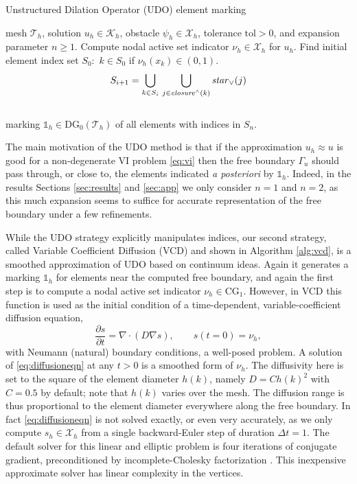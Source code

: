 \documentclass[]{interact}
\theoremstyle{plain}%
\theoremstyle{definition}
\theoremstyle{remark}
\newcommand{\grad}{\nabla}
\newcommand{\Div}{\nabla\cdot}
\newcommand{\cK}{\mathcal{K}}
\newcommand{\cT}{\mathcal{T}}
\newcommand{\cX}{\mathcal{X}}
\newcommand{\CG}{\text{CG}}
\newcommand{\DG}{\text{DG}}
\newcommand{\oneh}{\mathbb{1}_h}
\begin{document}
\begin{algorithm}[ht]
	\caption{Unstructured Dilation Operator (UDO) element marking}
	\begin{algorithmic}[1]
		\Require mesh $\cT_h$, solution $u_h \in \cK_h$, obstacle $\psi_h \in \cX_h$, tolerance $\text{tol} > 0$, and expansion parameter $n\ge 1$.
		\State Compute nodal active set indicator $\nu_h \in \cX_h$ for $u_h$.
		\State Find initial element index set $S_0$: \,$k\in S_0$ if $\nu_h(x_k) \in (0,1)$.
		    $$S_{i+1} = \bigcup_{k\in S_i}\, \bigcup_{j\in \text{\emph{closure}}^\wedge(k)} \text{\emph{star}}_\vee(j)$$
		\EndFor \\
		\Return marking $\oneh \in \DG_0(\cT_h)$ of all elements with indices in $S_n$.
	\end{algorithmic}
\label{alg:udo}
\end{algorithm}

The main motivation of the UDO method is that if the approximation $u_h\approx u$ is good for a non-degenerate VI problem \eqref{eq:vi} then the free boundary $\Gamma_u$ should pass through, or close to, the elements indicated \emph{a posteriori} by $\oneh$.  Indeed, in the results Sections \ref{sec:results} and \ref{sec:app} we only consider $n=1$ and $n=2$, as this much expansion seems to suffice for accurate representation of the free boundary under a few refinements.

While the UDO strategy explicitly manipulates indices, our second strategy, called Variable Coefficient Diffusion (VCD) and shown in Algorithm \ref{alg:vcd}, is a smoothed approximation of UDO based on continuum ideas.  Again it generates a marking $\oneh$ for elements near the computed free boundary, and again the first step is to compute a nodal active set indicator $\nu_h \in \CG_1$.  However, in VCD this function is used as the initial condition of a time-dependent, variable-coefficient diffusion equation,
\begin{equation} \label{eq:diffusioneqn}
\frac{\partial s}{\partial t} = \Div\left(D \grad s\right), \qquad s(t=0) = \nu_h,
\end{equation}
with Neumann (natural) boundary conditions, a well-posed problem.  A solution of \eqref{eq:diffusioneqn} at any $t>0$ is a smoothed form of $\nu_h$.  The diffusivity here is set to the square of the element diameter $h(k)$, namely $D=C h(k)^2$ with $C=0.5$ by default; note that $h(k)$ varies over the mesh.  The diffusion range is thus proportional to the element diameter everywhere along the free boundary.  In fact \eqref{eq:diffusioneqn} is not solved exactly, or even very accurately, as we only compute $s_h\in\cX_h$ from a single backward-Euler step of duration $\Delta t = 1$.  The default solver for this linear and elliptic problem is four iterations of conjugate gradient, preconditioned by incomplete-Cholesky factorization \cite{Bueler2021}.  This inexpensive approximate solver has linear complexity in the vertices.
\end{document}
